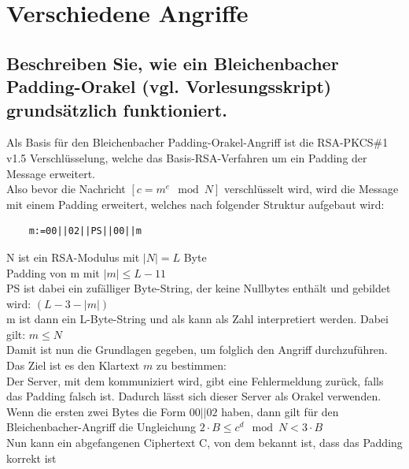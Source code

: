 \section{Verschiedene Angriffe}
\subsection{Beschreiben Sie, wie ein Bleichenbacher Padding-Orakel (vgl. Vorlesungsskript) grundsätzlich funktioniert.}
Als Basis für den Bleichenbacher Padding-Orakel-Angriff ist die RSA-PKCS\#1 v1.5 Verschlüsselung, welche das Basis-RSA-Verfahren um ein Padding der Message erweitert.\\
Also bevor die Nachricht $[c = m^{e} \mod N]$ verschlüsselt wird, wird die Message mit einem Padding erweitert, welches nach folgender Struktur aufgebaut wird:
\begin{verbatim}
    m:=00||02||PS||00||m
\end{verbatim}
N ist ein RSA-Modulus mit $|N| = L$ Byte\\
Padding von m mit $|m| \leq L-11$\\ %
PS ist dabei ein zufälliger Byte-String, der keine Nullbytes enthält und gebildet wird: $(L-3- |m|)$\\
m ist dann ein L-Byte-String und als kann als Zahl interpretiert werden. Dabei gilt: $m \leq N$\\[0.5cm]
Damit ist nun die Grundlagen gegeben, um folglich den Angriff durchzuführen. Das Ziel ist es den Klartext $m$ zu bestimmen:\\
Der Server, mit dem kommuniziert wird, gibt eine Fehlermeldung zurück, falls das Padding falsch ist. Dadurch lässt sich dieser Server als Orakel verwenden.\\
Wenn die ersten zwei Bytes die Form $00||02$ haben, dann gilt für den Bleichenbacher-Angriff die Ungleichung $2 \cdot B \leq c^d \mod N < 3 \cdot B$\\
Nun kann ein abgefangenen Ciphertext C, von dem bekannt ist, dass das Padding korrekt ist 

